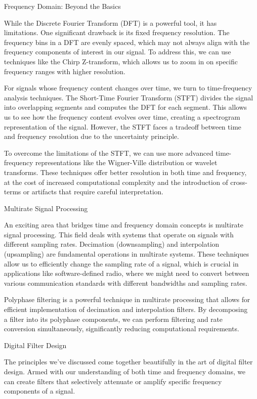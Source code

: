 Frequency Domain: Beyond the Basics

While the Discrete Fourier Transform (DFT) is a powerful tool, it has limitations. One significant drawback is its fixed frequency resolution. The frequency bins in a DFT are evenly spaced, which may not always align with the frequency components of interest in our signal. To address this, we can use techniques like the Chirp Z-transform, which allows us to zoom in on specific frequency ranges with higher resolution.

For signals whose frequency content changes over time, we turn to time-frequency analysis techniques. The Short-Time Fourier Transform (STFT) divides the signal into overlapping segments and computes the DFT for each segment. This allows us to see how the frequency content evolves over time, creating a spectrogram representation of the signal. However, the STFT faces a tradeoff between time and frequency resolution due to the uncertainty principle.

To overcome the limitations of the STFT, we can use more advanced time-frequency representations like the Wigner-Ville distribution or wavelet transforms. These techniques offer better resolution in both time and frequency, at the cost of increased computational complexity and the introduction of cross-terms or artifacts that require careful interpretation.

Multirate Signal Processing

An exciting area that bridges time and frequency domain concepts is multirate signal processing. This field deals with systems that operate on signals with different sampling rates. Decimation (downsampling) and interpolation (upsampling) are fundamental operations in multirate systems. These techniques allow us to efficiently change the sampling rate of a signal, which is crucial in applications like software-defined radio, where we might need to convert between various communication standards with different bandwidths and sampling rates.

Polyphase filtering is a powerful technique in multirate processing that allows for efficient implementation of decimation and interpolation filters. By decomposing a filter into its polyphase components, we can perform filtering and rate conversion simultaneously, significantly reducing computational requirements.

Digital Filter Design

The principles we've discussed come together beautifully in the art of digital filter design. Armed with our understanding of both time and frequency domains, we can create filters that selectively attenuate or amplify specific frequency components of a signal. 

